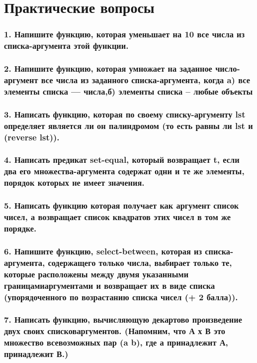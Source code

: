 \section*{Практические вопросы}


\subsubsection*{1. Напишите функцию, которая уменьшает на 10 все числа из списка-аргумента этой функции.}

\subsubsection*{2. Напишите функцию, которая умножает на заданное число-аргумент все числа из заданного списка-аргумента, когда \newline a) все элементы списка --- числа,\newline б) элементы списка -- любые объекты}


\subsubsection*{3. Написать функцию, которая по своему списку-аргументу lst определяет является ли он палиндромом (то есть равны ли lst и (reverse lst)).}


\subsubsection*{4. Написать предикат set-equal, который возвращает t, если два его множества-аргумента содержат одни и те же элементы, порядок которых не имеет значения.}


\subsubsection*{5. Написать функцию которая получает как аргумент список чисел, а возвращает список квадратов этих чисел в том же порядке.
}


\subsubsection*{6. Напишите функцию, select-between, которая из списка-аргумента, содержащего только числа, выбирает только те, которые расположены между двумя указанными границамиаргументами и возвращает их в виде списка (упорядоченного по возрастанию списка чисел (+ 2 балла)).
}


\subsubsection*{7. Написать функцию, вычисляющую декартово произведение двух своих списковаргументов. (Напомним, что А х В это множество всевозможных пар (a b), где а принадлежит А, принадлежит В.)}


